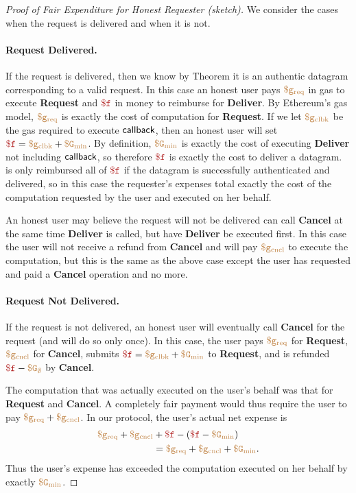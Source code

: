 \begin{proof}[Proof of Fair Expenditure for Honest Requester (sketch)]
We consider the cases when the request is delivered and when it is not.

\paragraph{Request Delivered.}
If the request is delivered, then we know by Theorem  it is an authentic datagram corresponding to a valid request.
In this case an honest user pays $\tt {\color{brown} \$g_\text{req} }$ in gas to execute {\bf Request} and $\fee$ in money to reimburse \tc for {\bf Deliver}.
By Ethereum's gas model, $\tt {\color{brown} \$g_\text{req} }$ is exactly the cost of computation for {\bf Request}.
If we let $\tt {\color{brown} \$g_\text{clbk} }$ be the gas required to execute ${\sf callback}$, then an honest user will set $\fee = \gascallback + \constgasmin$.
By definition, $\tt {\color{brown} \$G_\text{min} }$ is exactly the cost of executing {\bf Deliver} not including ${\sf callback}$, so therefore $\fee$ is exactly the cost to deliver a datagram.
\tcs is only reimbursed all of $\fee$ if the datagram is successfully authenticated and delivered, so in this case the requester's expenses total exactly the cost of the computation requested by the user and executed on her behalf.

An honest user may believe the request will not be delivered can call {\bf Cancel} at the same time {\bf Deliver} is called, but have {\bf Deliver} be executed first.
In this case the user will not receive a refund from {\bf Cancel} and will pay $\tt {\color{brown} \$g_\text{cncl} }$ to execute the computation,
but this is the same as the above case except the user has requested and paid a {\bf Cancel} operation and no more.


\paragraph{Request Not Delivered.}
If the request is not delivered, an honest user will eventually call {\bf Cancel} for the request (and will do so only once).
In this case, the user pays $\tt {\color{brown} \$g_\text{req} }$ for {\bf Request}, $\tt {\color{brown} \$g_\text{cncl} }$ for {\bf Cancel}, submits $\fee = \gascallback + \constgasmin$ to {\bf Request},
and is refunded $\fee - \constgascancel$ by {\bf Cancel}.

The computation that was actually executed on the user's behalf was that for {\bf Request} and {\bf Cancel}.
A completely fair payment would thus require the user to pay $\tt {\color{brown} \$g_\text{req} } + \tt {\color{brown} \$g_\text{cncl} }$.
In our protocol, the user's actual net expense is
\begin{align*}
  \gasrequest + \gascancel & + \fee - (\fee - \constgasmin) \\
                           & = \gasrequest + \gascancel + \constgasmin.
\end{align*}
Thus the user's expense has exceeded the computation executed on her behalf by exactly $\tt {\color{brown} \$G_\text{min} }$.
\end{proof}

